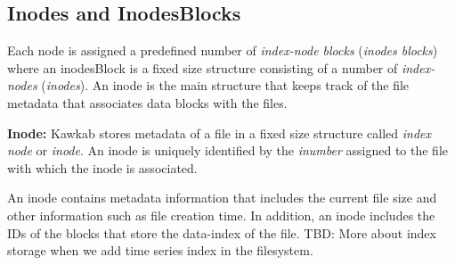 \documentclass[]{article}
\newcommand{\subtopic}[1]{\vspace{1.5pt} \noindent \textbf{#1}}
\newcommand{\hl}[1]{\textcolor{hlcolor}{#1}}
\begin{document}
\subsection{Inodes and InodesBlocks} 

Each node is assigned a predefined number of \textit{index-node blocks}
(\textit{inodes blocks}) where an inodesBlock is a fixed size structure
consisting of a number of \textit{index-nodes} (\textit{inodes}).  An inode
is the main structure that keeps track of the file metadata that associates
data blocks with the files.


\subtopic{Inode:} Kawkab stores metadata of a file in a fixed size structure
called \textit{index node} or \textit{inode}. An inode is uniquely identified by
the \textit{inumber} assigned to the file with which the inode is associated.

An inode contains metadata information that includes the current file size 
and other information such as file creation time. In addition, an inode includes
the IDs of the blocks that store the data-index of the file.
\hl{TBD: More about index storage when we add time series index in the
filesystem.}


%
%
%
%
%
\end{document}

